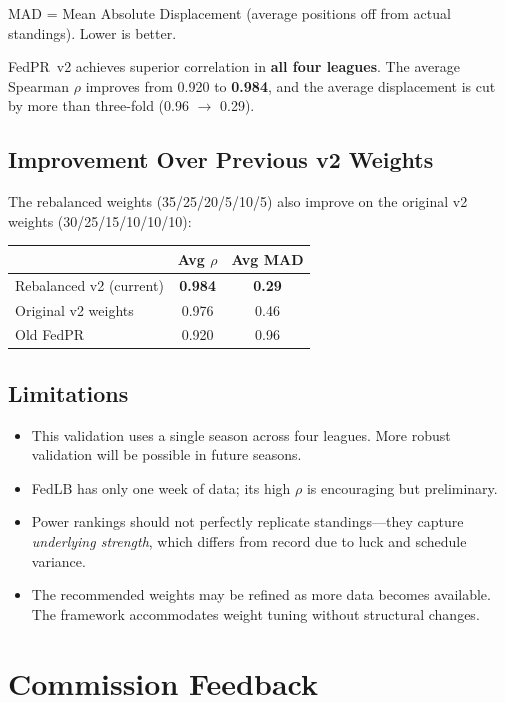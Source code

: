 \documentclass[11pt,a4paper]{article}
\begin{document}
\noindent MAD = Mean Absolute Displacement (average positions off from actual standings). Lower is better.

FedPR~v2 achieves superior correlation in \textbf{all four leagues}. The average Spearman $\rho$ improves from 0.920 to \textbf{0.984}, and the average displacement is cut by more than three-fold (0.96 $\to$ 0.29).

\subsection{Improvement Over Previous v2 Weights}

The rebalanced weights (35/25/20/5/10/5) also improve on the original v2 weights (30/25/15/10/10/10):

\begin{table}[H]
\centering
\begin{tabular}{@{}lcc@{}}
\toprule
& \textbf{Avg $\rho$} & \textbf{Avg MAD}\\
\midrule
Rebalanced v2 (current) & \textbf{0.984} & \textbf{0.29}\\
Original v2 weights & 0.976 & 0.46\\
Old FedPR & 0.920 & 0.96\\
\bottomrule
\end{tabular}
\end{table}

\subsection{Limitations}

\begin{itemize}[nosep]
\item This validation uses a single season across four leagues. More robust validation will be possible in future seasons.
\item FedLB has only one week of data; its high $\rho$ is encouraging but preliminary.
\item Power rankings should not perfectly replicate standings---they capture \emph{underlying strength}, which differs from record due to luck and schedule variance.
\item The recommended weights may be refined as more data becomes available. The framework accommodates weight tuning without structural changes.
\end{itemize}


\section{Commission Feedback}
\end{document}
